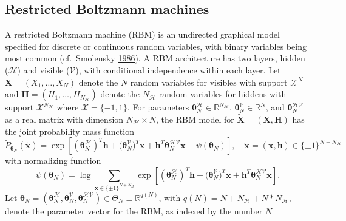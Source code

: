 \documentclass[12pt]{article}
\theoremstyle{definition}
\begin{document}


\subsection{Restricted Boltzmann
machines}\label{restricted-boltzmann-machines}

A restricted Boltzmann machine (RBM) is an undirected graphical model specified for discrete or continuous random variables, with binary variables being most common (cf.~Smolensky
\protect\hyperlink{ref-smolensky1986information}{1986}).  A RBM architecture has two layers, hidden ($\mathcal{H}$) and visible ($\mathcal{V}$), with conditional independence within each layer. Let $\boldsymbol X=(X_1,\ldots,X_N)$ denote the $N$ random variables for visibles with support $\mathcal{X}^N$ and $\boldsymbol H=(H_1,\ldots,H_{N_\mathcal{H}})$ denote the $N_\mathcal{H}$ random variables for hiddens with support $\mathcal{X}^{N_\mathcal{H}}$ where  $\mathcal{X} = \{-1,1\}$. For parameters $\boldsymbol \theta_N^{\mathcal{H}} \in \mathbb{R}^{N_\mathcal{H}}$, $\boldsymbol \theta_N^{\mathcal{V}}\in \mathbb{R}^N$, and $\boldsymbol \theta_N^{\mathcal{HV}}$ as a real matrix with dimension $N_\mathcal{H} \times N$, the RBM model for $\tilde{\boldsymbol X}=(\boldsymbol X,\boldsymbol H)$  has the joint probability mass function
\begin{equation}
\label{eqn:RBM1}
\tilde{P}_{\boldsymbol \theta_N} (\tilde{\boldsymbol x}) = \exp\left[ (\boldsymbol \theta_N^{\mathcal{H}})^T \boldsymbol h + \boldsymbol (\boldsymbol \theta_N^{\mathcal{V}})^T \boldsymbol x + \boldsymbol h^T  \boldsymbol\theta_N^{\mathcal{HV}} \boldsymbol x - \psi(\boldsymbol \theta_N)\right], \quad \tilde{\boldsymbol x} = (\boldsymbol x, \boldsymbol h) \in \{\pm 1\}^{N+N_\mathcal{H}}
\end{equation}
with normalizing function
$$
\psi(\boldsymbol \theta_N) = \log \sum_{\tilde{\boldsymbol x} \in \{\pm 1\}^{N+N_H} } \exp\left[ (\boldsymbol \theta_N^{\mathcal{H}})^T \boldsymbol h + \boldsymbol (\boldsymbol \theta_N^{\mathcal{V}})^T \boldsymbol x + \boldsymbol h^T  \boldsymbol\theta_N^{\mathcal{HV}} \boldsymbol x\right].
$$
 Let $\boldsymbol \theta_N = (\boldsymbol \theta_N^{\mathcal{H}}, \boldsymbol \theta_N^{\mathcal{V}}, \boldsymbol\theta_N^{\mathcal{HV}} ) \in \Theta_N \equiv \mathbb{R}^{q(N)}$, with $q(N) = N + N_\mathcal{H} + N*N_\mathcal{H}$, denote the parameter vector  for the RBM,  as indexed by the number $N$
\end{document}
